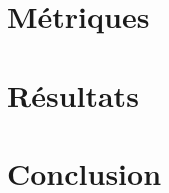 \documentclass[a4paper]{article}
\begin{document}
\section{Métriques}

\section{Résultats}

\section{Conclusion}

\end{document}
